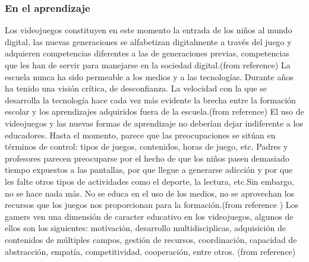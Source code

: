 \documentclass{bmcart}
\begin{document}
\subsubsection*{En el aprendizaje}
Los videojuegos constituyen en este momento la entrada de los niños al mundo digital, las nuevas generaciones se alfabetizan digitalmente a través del juego y adquieren competencias diferentes a las de generaciones previas, competencias que les han de servir para manejarse en la sociedad digital.(from reference\cite{ruiz2012aprendiendo})
\newline
\newline
La escuela nunca ha sido permeable a los medios y a las tecnologías.
Durante años ha tenido una visión crítica, de desconfianza. La velocidad con la que se desarrolla la tecnología hace cada vez más evidente la brecha entre la formación escolar y los aprendizajes adquiridos fuera de la escuela.(from reference\cite{ruiz2012aprendiendo})
\newline
\newline
El uso de videojuegos y las nuevas formas de aprendizaje no deberían dejar indiferente a los educadores. Hasta el momento, parece que las preocupaciones se sitúan en términos de control: tipos de juegos, contenidos, horas de juego, etc. Padres y profesores parecen preocuparse por el hecho de que los niños pasen demasiado tiempo expuestos a las pantallas, por que llegue a generarse adicción y por que les falte otros tipos de actividades como el deporte, la lectura, etc.Sin embargo, no se hace nada más. No se educa en el uso de los medios, no se aprovechan los recursos que los juegos nos proporcionan para la formación.(from reference \cite{salvat2008videojuegos})
\newline
\newline
Los gamers ven una dimensión de caracter educativo en los videojuegos, algunos de ellos son los siguientes: motivación, desarrollo multidisciplicas, adquisición de contenidos de múltiples campos, gestión de recursos, coordinación, capacidad de abstracción, empatía, competitividad, cooperación, entre otros. (from reference\cite{dominguez2012que})
\end{document}
